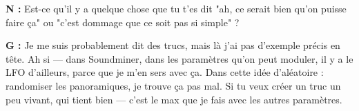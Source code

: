 ﻿\documentclass[12pt]{article}
\begin{document}
\textbf{N :} Est-ce qu'il y a quelque chose que tu t'es dit "ah, ce serait bien qu'on puisse faire ça" ou "c'est dommage que ce soit pas si simple" ? 

\textbf{G :} Je me suis probablement dit des trucs, mais là j'ai pas d'exemple précis en tête. Ah si — dans Soundminer, dans les paramètres qu'on peut moduler, il y a le LFO d'ailleurs, parce que je m'en sers avec ça. Dans cette idée d'aléatoire : randomiser les panoramiques, je trouve ça pas mal. Si tu veux créer un truc un peu vivant, qui tient bien — c'est le max que je fais avec les autres paramètres. 

\setlength{\parindent}{15pt}
\end{document}
